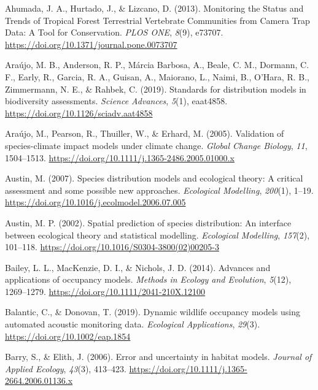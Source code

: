 \documentclass[
]{article}
\newlength{\cslhangindent}
\newenvironment{CSLReferences}[2] %
 {\begin{list}{}{%
  \setlength{\itemindent}{0pt}
  \setlength{\leftmargin}{0pt}
  \setlength{\parsep}{0pt}
  \ifodd #1
   \setlength{\leftmargin}{\cslhangindent}
   \setlength{\itemindent}{-1\cslhangindent}
  \fi
  \setlength{\itemsep}{#2\baselineskip}}}
 {\end{list}}
\begin{document}
\label{refs}
\begin{CSLReferences}{1}{0}
Ahumada, J. A., Hurtado, J., \& Lizcano, D. (2013). Monitoring the
Status and Trends of Tropical Forest Terrestrial Vertebrate Communities
from Camera Trap Data: A Tool for Conservation. \emph{PLOS ONE},
\emph{8}(9), e73707. \url{https://doi.org/10.1371/journal.pone.0073707}

Araújo, M. B., Anderson, R. P., Márcia Barbosa, A., Beale, C. M.,
Dormann, C. F., Early, R., Garcia, R. A., Guisan, A., Maiorano, L.,
Naimi, B., O'Hara, R. B., Zimmermann, N. E., \& Rahbek, C. (2019).
Standards for distribution models in biodiversity assessments.
\emph{Science Advances}, \emph{5}(1), eaat4858.
\url{https://doi.org/10.1126/sciadv.aat4858}

Araújo, M., Pearson, R., Thuiller, W., \& Erhard, M. (2005). Validation
of species-climate impact models under climate change. \emph{Global
Change Biology}, \emph{11}, 1504--1513.
\url{https://doi.org/10.1111/j.1365-2486.2005.01000.x}

Austin, M. (2007). Species distribution models and ecological theory: A
critical assessment and some possible new approaches. \emph{Ecological
Modelling}, \emph{200}(1), 1--19.
\url{https://doi.org/10.1016/j.ecolmodel.2006.07.005}

Austin, M. P. (2002). Spatial prediction of species distribution: An
interface between ecological theory and statistical modelling.
\emph{Ecological Modelling}, \emph{157}(2), 101--118.
\url{https://doi.org/10.1016/S0304-3800(02)00205-3}

Bailey, L. L., MacKenzie, D. I., \& Nichols, J. D. (2014). Advances and
applications of occupancy models. \emph{Methods in Ecology and
Evolution}, \emph{5}(12), 1269--1279.
\url{https://doi.org/10.1111/2041-210X.12100}

Balantic, C., \& Donovan, T. (2019). Dynamic wildlife occupancy models
using automated acoustic monitoring data. \emph{Ecological
Applications}, \emph{29}(3). \url{https://doi.org/10.1002/eap.1854}

Barry, S., \& Elith, J. (2006). Error and uncertainty in habitat models.
\emph{Journal of Applied Ecology}, \emph{43}(3), 413--423.
\url{https://doi.org/10.1111/j.1365-2664.2006.01136.x}


\end{CSLReferences}
\end{document}
